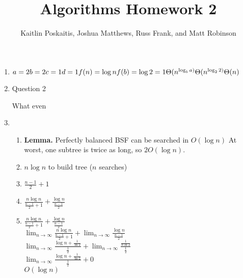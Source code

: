 \documentclass[12pt]{article}
\title{\bf Algorithms Homework 2}
\author{Kaitlin Poskaitis, Joshua Matthews, Russ Frank, and Matt Robinson}
\date{}
\begin{document}
\maketitle

\begin{enumerate}

\item

  $a = 2\\
  b = 2\\
  c = 1\\
  d = 1\\
  f(n) = \log n\\
  f(b) = \log 2 = 1\\
  \Theta (n^{\log_b a)}\\
  \Theta (n^{\log_2 2)}\\
  \Theta (n)\\$

\item Question 2

  What even

\item

  \begin{enumerate}
    \item \textbf{Lemma.} Perfectly balanced BSF can be searched in $O(\log n)$
    At worst, one subtree is twice as long, so $2O(\log n)$.

    \item $n \log n$ to build tree ($n$ searches)

    \item $\frac{n - 1}{2} + 1$

    \item $\frac{n\log n}{\frac{n - 1}{2} + 1} + \frac{\log n}{\frac{n - 1}{2}}$
    
    \item $\frac{n\log n}{\frac{n - 1}{2} + 1} + \frac{\log n}{\frac{n - 1}{2}}$\\
    $\lim_{n \to \infty} \frac{n\log n}{\frac{n - 1}{2} + 1} + \lim_{n \to \infty} \frac{\log n}{\frac{n - 1}{2}}$\\
    $\lim_{n \to \infty} \frac{\log n + \frac{1}{\ln 2}}{\frac{1}{2}} + \lim_{n \to \infty} \frac{\frac{1}{n\ln 2}}{\frac{1}{2}}$\\
    $\lim_{n \to \infty} \frac{\log n + \frac{1}{\ln 2}}{\frac{1}{2}} + 0$\\
    $O(\log n)$
  \end{enumerate}


\end{enumerate}
\end{document}
